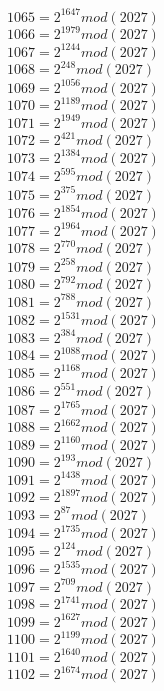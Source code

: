 \documentclass[12pt, letterpaper]{article}
\begin{document}
\begin{itemize}
\begin{multicols}{3}
$1065= 2^{1647} mod (2027)$\\
$1066= 2^{1979} mod (2027)$\\
$1067= 2^{1244} mod (2027)$\\
$1068= 2^{248} mod (2027)$\\
$1069= 2^{1056} mod (2027)$\\
$1070= 2^{1189} mod (2027)$\\
$1071= 2^{1949} mod (2027)$\\
$1072= 2^{421} mod (2027)$\\
$1073= 2^{1384} mod (2027)$\\
$1074= 2^{595} mod (2027)$\\
$1075= 2^{375} mod (2027)$\\
$1076= 2^{1854} mod (2027)$\\
$1077= 2^{1964} mod (2027)$\\
$1078= 2^{770} mod (2027)$\\
$1079= 2^{258} mod (2027)$\\
$1080= 2^{792} mod (2027)$\\
$1081= 2^{788} mod (2027)$\\
$1082= 2^{1531} mod (2027)$\\
$1083= 2^{384} mod (2027)$\\
$1084= 2^{1088} mod (2027)$\\
$1085= 2^{1168} mod (2027)$\\
$1086= 2^{551} mod (2027)$\\
$1087= 2^{1765} mod (2027)$\\
$1088= 2^{1662} mod (2027)$\\
$1089= 2^{1160} mod (2027)$\\
$1090= 2^{193} mod (2027)$\\
$1091= 2^{1438} mod (2027)$\\
$1092= 2^{1897} mod (2027)$\\
$1093= 2^{87} mod (2027)$\\
$1094= 2^{1735} mod (2027)$\\
$1095= 2^{124} mod (2027)$\\
$1096= 2^{1535} mod (2027)$\\
$1097= 2^{709} mod (2027)$\\
$1098= 2^{1741} mod (2027)$\\
$1099= 2^{1627} mod (2027)$\\
$1100= 2^{1199} mod (2027)$\\
$1101= 2^{1640} mod (2027)$\\
$1102= 2^{1674} mod (2027)$\\

\end{multicols}
\end{itemize}
\end{document}
